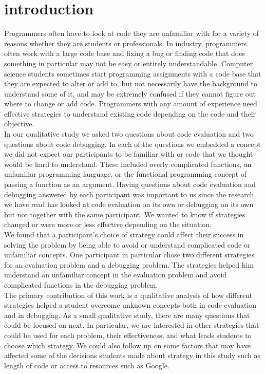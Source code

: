 \section{introduction}

Programmers often have to look at code they are unfamiliar with for a variety of reasons whether they are students or professionals.
In industry, programmers often work with a large code base and fixing a bug or finding code that does something in particular may not be easy or entirely understandable.
Computer science students sometimes start programming assignments with a code base that they are expected to alter or add to, but not necessarily have the background to understand some of it, and may be extremely confused if they cannot figure out where to change or add code.
Programmers with any amount of experience need effective strategies to understand existing code depending on the code and their objective. \\

In our qualitative study we asked two questions about code evaluation and two questions about code debugging.
In each of the questions we embedded a concept we did not expect our participants to be familiar with or code that we thought would be hard to understand.
These included overly complicated functions, an unfamiliar programming language, or the functional programming concept of passing a function as an argument.
Having questions about code evaluation and debugging answered by each participant was important to us since the research we have read has looked at code evaluation on its own or debugging on its own but not together with the same participant.
We wanted to know if strategies changed or were more or less effective depending on the situation. \\

We found that a participant's choice of strategy could affect their success in solving the problem by being able to avoid or understand complicated code or unfamiliar concepts.
One participant in particular chose two different strategies for an evaluation problem and a debugging problem.
The strategies helped him understand an unfamiliar concept in the evaluation problem and avoid complicated functions in the debugging problem. \\

The primary contribution of this work is a qualitative analysis of how different strategies helped a student overcome unknown concepts both in code evaluation and in debugging.
As a small qualitative study, there are many questions that could be focused on next.
In particular, we are interested in other strategies that could be used for each problem, their effectiveness, and what leads students to choose which strategy.
We could also follow up on some factors that may have affected some of the decisions students made about strategy in this study such as length of code or access to resources such as Google.\\

\newpage